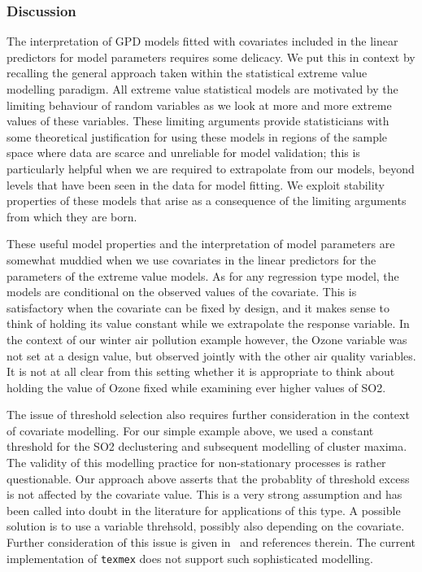 \documentclass[10pt]{article}\usepackage[]{graphicx}\usepackage[]{color}
\begin{document}
\subsubsection*{Discussion}
%
The interpretation of GPD models fitted with covariates included in the linear predictors for model parameters requires some delicacy. We put this in context by recalling the general approach taken within the statistical extreme value modelling paradigm.  All extreme value statistical models are motivated by the limiting behaviour of random variables as we look at more and more extreme values of these variables.  These limiting arguments provide statisticians with some theoretical justification for using these models in regions of the sample space where data are scarce and unreliable for model validation; this is particularly helpful when we are required to extrapolate from our models, beyond levels that have been seen in the data for model fitting.  We exploit stability properties of these models that arise as a consequence of the limiting arguments from which they are born.

These useful model properties and the interpretation of model parameters are somewhat muddied when we use covariates in the linear predictors for the parameters of the extreme value models.  As for any regression type model, the models are conditional on the observed values of the covariate.  This is satisfactory when the covariate can be fixed by design, and it makes sense to think of holding its value constant while we extrapolate the response variable.  In the context of our winter air pollution example however, the Ozone variable was not set at a design value, but observed jointly with the other air quality variables. It is not at all clear from this setting whether it is appropriate to think about holding the value of Ozone fixed while examining ever higher values of SO2.

The issue of threshold selection also requires further consideration in the context of covariate modelling.  For our simple example above, we used a constant threshold for the SO2 declustering and subsequent modelling of cluster maxima.  The validity of this modelling practice for non-stationary processes is rather questionable.  Our approach above asserts that the probablity of threshold excess is not affected by the covariate value.  This is a very strong assumption and has been called into doubt in the literature for applications of this type.  A possible solution is to use a variable threhsold, possibly also depending on the covariate.  Further consideration of this issue is given in~\cite{northropJonathan} and references therein.  The current implementation of {\tt texmex} does not support such sophisticated modelling.



\end{document}
